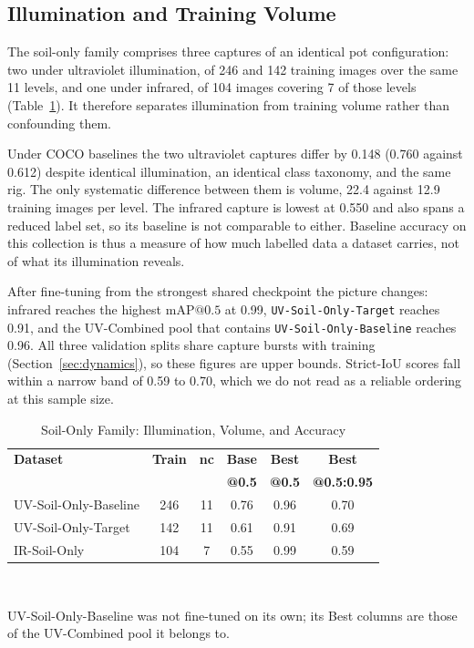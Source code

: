 ﻿\documentclass[journal]{IEEEtran}
\begin{document}
\subsection{Illumination and Training Volume}
The soil-only family comprises three captures of an identical pot configuration: two under ultraviolet illumination, of 246 and 142 training images over the same 11 levels, and one under infrared, of 104 images covering 7 of those levels (Table~\ref{tab:modality}). It therefore separates illumination from training volume rather than confounding them.

Under COCO baselines the two ultraviolet captures differ by 0.148 (0.760 against 0.612) despite identical illumination, an identical class taxonomy, and the same rig. The only systematic difference between them is volume, 22.4 against 12.9 training images per level. The infrared capture is lowest at 0.550 and also spans a reduced label set, so its baseline is not comparable to either. Baseline accuracy on this collection is thus a measure of how much labelled data a dataset carries, not of what its illumination reveals.

After fine-tuning from the strongest shared checkpoint the picture changes: infrared reaches the highest $\text{mAP@0.5}$ at 0.99, \texttt{UV-Soil-Only-Target} reaches 0.91, and the UV-Combined pool that contains \texttt{UV-Soil-Only-Baseline} reaches 0.96. All three validation splits share capture bursts with training (Section~\ref{sec:dynamics}), so these figures are upper bounds. Strict-IoU scores fall within a narrow band of 0.59 to 0.70, which we do not read as a reliable ordering at this sample size.

\begin{table}[!t]
\renewcommand{\arraystretch}{1.3}
\caption{Soil-Only Family: Illumination, Volume, and Accuracy}
\label{tab:modality}
\centering
\footnotesize
\setlength{\tabcolsep}{3.5pt}
\begin{tabular}{l c c c c c}
\toprule
\textbf{Dataset} & \textbf{Train} & \textbf{nc} & \textbf{Base} & \textbf{Best} & \textbf{Best} \\
 & & & \textbf{@0.5} & \textbf{@0.5} & \textbf{@0.5:0.95} \\
\midrule
UV-Soil-Only-Baseline & 246 & 11 & 0.76 & 0.96 & 0.70 \\
UV-Soil-Only-Target & 142 & 11 & 0.61 & 0.91 & 0.69 \\
IR-Soil-Only & 104 & 7 & 0.55 & 0.99 & 0.59 \\
\bottomrule
\end{tabular}
\\[2pt]
\parbox{\columnwidth}{\footnotesize UV-Soil-Only-Baseline was not fine-tuned on its own; its Best columns are those of the UV-Combined pool it belongs to.}
\end{table}
\end{document}
